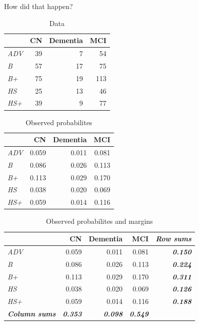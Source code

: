 \documentclass[
  ignorenonframetext,
]{beamer}
\begin{document}
\begin{frame}{How did that happen?}
\protect\hypertarget{how-did-that-happen}{}

\begin{table}[t]

\caption{\label{tab:edu_dx_chi2}Data}
\centering
\begin{tabular}{>{\em}lrrr}
\toprule
  & CN & Dementia & MCI\\
\midrule
ADV & 39 & 7 & 54\\
B & 57 & 17 & 75\\
B+ & 75 & 19 & 113\\
HS & 25 & 13 & 46\\
HS+ & 39 & 9 & 77\\
\bottomrule
\end{tabular}
\end{table}

\end{frame}

\begin{frame}

\begin{table}[t]

\caption{\label{tab:edu_dx_chi2_o}Observed probabilites}
\centering
\begin{tabular}{>{\em}lrrr}
\toprule
  & CN & Dementia & MCI\\
\midrule
ADV & 0.059 & 0.011 & 0.081\\
B & 0.086 & 0.026 & 0.113\\
B+ & 0.113 & 0.029 & 0.170\\
HS & 0.038 & 0.020 & 0.069\\
HS+ & 0.059 & 0.014 & 0.116\\
\bottomrule
\end{tabular}
\end{table}

\end{frame}

\begin{frame}

\begin{table}[t]

\caption{\label{tab:edu_dx_chi2_osums}Observed probabilites and margins}
\centering
\begin{tabular}{>{\em}lrrr>{\bfseries\em}r}
\toprule
  & CN & Dementia & MCI & Row sums\\
\midrule
ADV & 0.059 & 0.011 & 0.081 & 0.150\\
B & 0.086 & 0.026 & 0.113 & 0.224\\
B+ & 0.113 & 0.029 & 0.170 & 0.311\\
HS & 0.038 & 0.020 & 0.069 & 0.126\\
HS+ & 0.059 & 0.014 & 0.116 & 0.188\\
\addlinespace
\em{\textbf{Column sums}} & \em{\textbf{0.353}} & \em{\textbf{0.098}} & \em{\textbf{0.549}}\\
\bottomrule
\end{tabular}
\end{table}

\end{frame}
\end{document}
